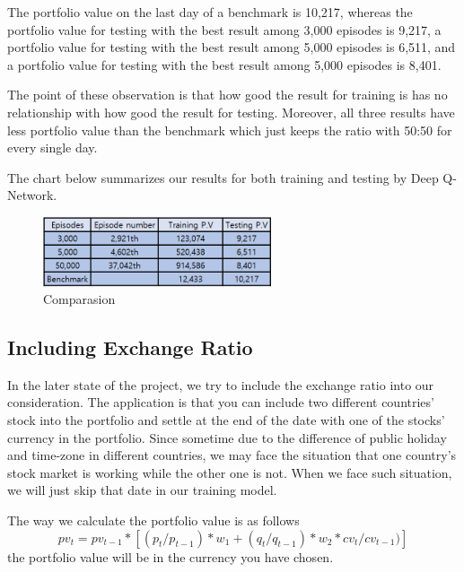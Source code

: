 The portfolio value on the last day of a benchmark is 10,217, whereas the portfolio value for testing with the best result among 3,000 episodes is 9,217, a portfolio value for testing with the best result among 5,000 episodes is 6,511, and a portfolio value for testing with the best result among 5,000 episodes is 8,401. 

The point of these observation is that how good the result for training is has no relationship with how good the result for testing. Moreover, all three results have less portfolio value than the benchmark which just keeps the ratio with 50:50 for every single day. 

The chart below summarizes our results for both training and testing by Deep Q-Network. 

\begin{figure}[H]
\begin{center}
\includegraphics[clip, width=0.6\textwidth]{Graphics/image2.png} \caption{Comparasion}
\end{center}
\end{figure}
\subsection{Including Exchange Ratio}
In the later state of the project, we try to include the exchange ratio into our consideration. The application is that you can include two different countries' stock into the portfolio and settle at the end of the date with one of the stocks' currency in the portfolio. Since sometime due to the difference of public holiday and time-zone in different countries, we may face the situation that one country's stock market is working while the other one is not. When we face such situation, we will just skip that date in our training model.

The way we calculate the portfolio value is as follows
$$ pv_{t} = pv_{t-1} *[ (p_{t} / p_{t-1}) * w_{1}  + (q_{t} / q_{t-1}) * w_{2} * cv_{t}/cv_{t-1})]$$
the portfolio value will be in the currency you have chosen.
\endinput


